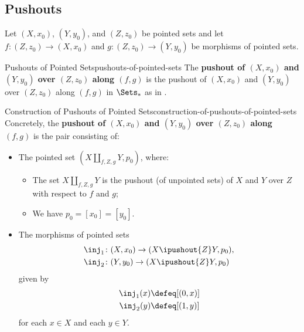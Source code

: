 \subsection{Pushouts}\label{subsection-pushouts-of-pointed-sets}
Let $(X,x_{0})$, $(Y,y_{0})$, and $(Z,z_{0})$ be pointed sets and let $f\colon(Z,z_{0})\to(X,x_{0})$ and $g\colon(Z,z_{0})\to(Y,y_{0})$ be morphisms of pointed sets.
\begin{definition}{Pushouts of Pointed Sets}{pushouts-of-pointed-sets}%
    The \textbf{pushout of $(X,x_{0})$ and $(Y,y_{0})$ over $(Z,z_{0})$ along $(f,g)$} is the pushout of $(X,x_{0})$ and $(Y,y_{0})$ over $(Z,z_{0})$ along $(f,g)$ in $\Sets_{*}$ as in .
\end{definition}
\begin{construction}{Construction of Pushouts of Pointed Sets}{construction-of-pushouts-of-pointed-sets}%
    Concretely, the \textbf{pushout of $(X,x_{0})$ and $(Y,y_{0})$ over $(Z,z_{0})$ along $(f,g)$} is the pair consisting of:
    \begin{itemize}
        \item{}The pointed set $(X\coprod_{f,Z,g}Y,p_{0})$, where:
            \begin{itemize}
                \item The set $X\coprod_{f,Z,g}Y$ is the pushout (of unpointed sets) of $X$ and $Y$ over $Z$ with respect to $f$ and $g$;
                \item We have $p_{0}=[x_{0}]=[y_{0}]$.
            \end{itemize}
        \item{}The morphisms of pointed sets
            \begin{align*}
                \inj_{1} &\colon(X,x_{0})\to(X\ipushout{Z}Y,p_{0}),\\
                \inj_{2} &\colon(Y,y_{0})\to(X\ipushout{Z}Y,p_{0})
            \end{align*}
            given by
            \begin{align*}
                \inj_{1}(x) &\defeq [(0,x)]\\%
                \inj_{2}(y) &\defeq [(1,y)]%
            \end{align*}
            for each $x\in X$ and each $y\in Y$.
    \end{itemize}
\end{construction}
